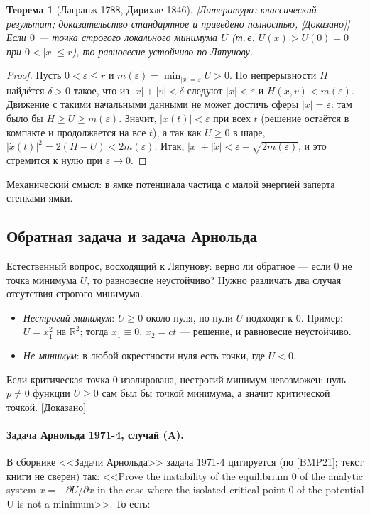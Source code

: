 \documentclass[11pt,a4paper]{article}
\newtheorem{theorem}{Теорема}[section]
\theoremstyle{definition}
\newcommand{\R}{\mathbb R}
\newcommand{\eps}{\varepsilon}
\newcommand{\mk}[1]{\textsf{[#1]}}
\newcommand{\term}[1]{\emph{#1}}
\begin{document}
\begin{theorem}[Лагранж 1788, Дирихле 1846]\label{thm:LD}
\mk{Литература: классический результат; доказательство стандартное и приведено полностью,
\mk{Доказано}} Если $0$ --- точка \term{строгого локального минимума} $U$ (т.\,е. $U(x)>U(0)=0$
при $0<|x|\le r$), то равновесие устойчиво по Ляпунову.
\end{theorem}
\begin{proof}
Пусть $0<\eps\le r$ и $m(\eps)=\min_{|x|=\eps}U>0$. По непрерывности $H$ найдётся $\delta>0$
такое, что из $|x|+|v|<\delta$ следуют $|x|<\eps$ и $H(x,v)<m(\eps)$. Движение с такими
начальными данными не может достичь сферы $|x|=\eps$: там было бы $H\ge U\ge m(\eps)$. Значит,
$|x(t)|<\eps$ при всех $t$ (решение остаётся в компакте и продолжается на все $t$), а так как
$U\ge0$ в шаре, $|\dot x(t)|^2=2(H-U)<2m(\eps)$. Итак, $|x|+|\dot x|<\eps+\sqrt{2m(\eps)}$, и
это стремится к нулю при $\eps\to0$.
\end{proof}

Механический смысл: в ямке потенциала частица с малой энергией заперта стенками ямки.

\subsection{Обратная задача и задача Арнольда}

Естественный вопрос, восходящий к Ляпунову: верно ли обратное --- если $0$ не точка минимума $U$,
то равновесие неустойчиво? Нужно различать два случая отсутствия строгого минимума.

\begin{itemize}[leftmargin=*]
\item \term{Нестрогий минимум}: $U\ge0$ около нуля, но нули $U$ подходят к $0$. Пример:
$U=x_1^2$ на $\R^2$; тогда $x_1\equiv0$, $x_2=ct$ --- решение, и равновесие неустойчиво.
\item \term{Не минимум}: в любой окрестности нуля есть точки, где $U<0$.
\end{itemize}

Если критическая точка $0$ изолирована, нестрогий минимум невозможен: нуль $p\ne0$ функции
$U\ge0$ сам был бы точкой минимума, а значит критической точкой. \mk{Доказано}

\paragraph{Задача Арнольда 1971-4, случай (A).} В сборнике <<Задачи Арнольда>> задача 1971-4
цитируется (по [BMP21]; текст книги не сверен) так: <<Prove the instability of the equilibrium 0
of the analytic system $\ddot x=-\partial U/\partial x$ in the case where the isolated critical
point 0 of the potential U is not a minimum>>. То есть:
\end{document}
